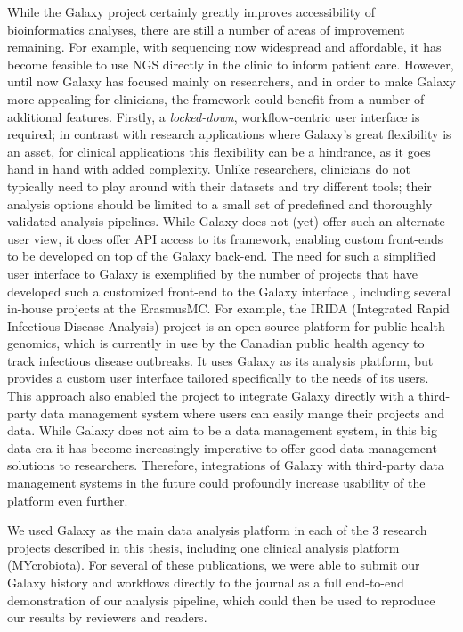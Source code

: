 While the Galaxy project certainly greatly improves accessibility of bioinformatics analyses, there are still a number of areas of improvement remaining.
For example, with sequencing now widespread and affordable, it has become feasible to use NGS directly in the clinic to inform patient care.
However, until now Galaxy has focused mainly on researchers, and in order to make Galaxy more appealing for clinicians, the framework could benefit from a number of additional features.
Firstly, a \emph{locked-down}, workflow-centric user interface is required; in contrast with research applications where Galaxy's great flexibility is an asset, for clinical applications this flexibility can be a hindrance, as it goes hand in hand with added complexity.
Unlike researchers, clinicians do not typically need to play around with their datasets and try different tools; their analysis options should be limited to a small set of predefined and thoroughly validated analysis pipelines.
While Galaxy does not (yet) offer such an alternate user view, it does offer API access to its framework, enabling custom front-ends to be developed on top of the Galaxy back-end.
The need for such a simplified user interface to Galaxy is exemplified by the number of projects that have developed such a customized front-end to the Galaxy interface \cite{klingstrom2017galaksio,matthews2018integrated,lemoine2019ngphylogeny,SEEK2015}, including several in-house projects at the ErasmusMC\@.
For example, the IRIDA (Integrated Rapid Infectious Disease Analysis) project \cite{matthews2018integrated} is an open-source platform for public health genomics, which is currently in use by the Canadian public health agency to track infectious disease outbreaks.
It uses Galaxy as its analysis platform, but provides a custom user interface tailored specifically to the needs of its users. This approach also enabled the project to integrate Galaxy directly with a third-party data management system where users can easily mange their projects and data.
While Galaxy does not aim to be a data management system, in this big data era it has become increasingly imperative to offer good data management solutions to researchers. Therefore, integrations of Galaxy with third-party data management systems in the future could profoundly increase usability of the platform even further.

We used Galaxy as the main data analysis platform in each of the 3 research projects described in this thesis, including one clinical analysis platform (MYcrobiota). For several of these publications, we were able to submit our Galaxy history and workflows directly to the journal as a full end-to-end demonstration of our analysis pipeline, which could then be used to reproduce our results by reviewers and readers.


